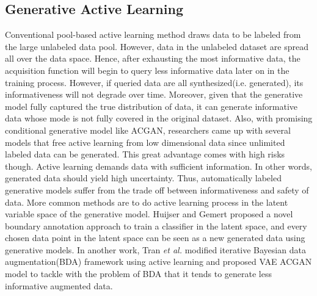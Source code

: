 \documentclass[10pt,twocolumn,letterpaper]{article}
\begin{document}
\subsection{Generative Active Learning}
Conventional pool-based active learning method draws data to be labeled from the large unlabeled data pool. However, data in the unlabeled dataset are spread all over the data space. Hence, after exhausting the most informative data, the acquisition function will begin to query less informative data later on in the training process. However, if queried data are all synthesized(i.e. generated), its informativeness will not degrade over time. Moreover, given that the generative model fully captured the true distribution of data, it can generate informative data whose mode is not fully covered in the original dataset\cite{Zhu2017GenerativeAA}. Also, with promising conditional generative model like ACGAN, researchers came up with several models that free active learning from low dimensional data since unlimited labeled data can be generated\cite{kong2019active}. This great advantage comes with high risks though. Active learning demands data with sufficient information. In other words, generated data should yield high uncertainty. Thus, automatically labeled generative models suffer from the trade off between informativeness and safety of data. More common methods are to do active learning process in the latent variable space of the generative model. Huijser and Gemert proposed a novel boundary annotation approach to train a classifier in the latent space, and every chosen data point in the latent space can be seen as a new generated data using generative models\cite{huijser2017active}. In another work, Tran \emph{et al.} modified iterative Bayesian data augmentation(BDA) framework using active learning and proposed VAE ACGAN model to tackle with the problem of BDA that it tends to generate less informative augmented data\cite{tran2019bayesian}.

  
\end{document}
